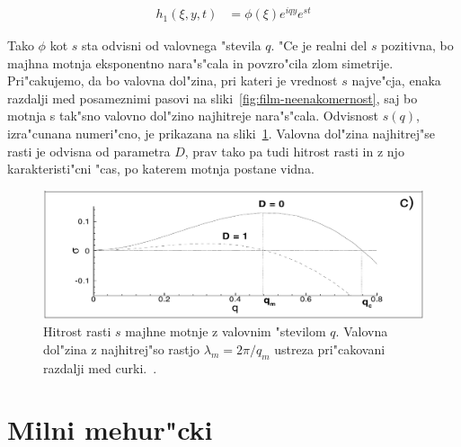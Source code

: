 \documentclass[a4paper,12pt]{article}
\begin{document}
\begin{align}
  h_1(\xi, y, t) &= \phi(\xi) e^{iqy} e^{s t}
\end{align}

Tako $\phi$ kot $s$ sta odvisni od valovnega "stevila $q$. "Ce je realni del $s$ pozitivna, bo majhna motnja eksponentno nara"s"cala in povzro"cila zlom simetrije. Pri"cakujemo, da bo valovna dol"zina, pri kateri je vrednost $s$ najve"cja, enaka razdalji med posameznimi pasovi na sliki~\ref{fig:film-neenakomernost}, saj bo motnja s tak"sno valovno dol"zino najhitreje nara"s"cala. Odvisnost $s(q)$, izra"cunana numeri"cno, je prikazana na sliki~\ref{fig:film-rast}. Valovna dol"zina najhitrej"se rasti je odvisna od parametra $D$, prav tako pa tudi hitrost rasti in z njo karakteristi"cni "cas, po katerem motnja postane vidna. 

\begin{figure}[h]
 \centering
 \includegraphics[width=.8\textwidth]{./Slike/film-stabilnost}
 \caption{Hitrost rasti $s$ majhne motnje z valovnim "stevilom $q$. Valovna dol"zina z najhitrej"so rastjo $\lambda_m = 2\pi/q_m$ ustreza pri"cakovani razdalji med curki.~\cite{kondic}. }
 \label{fig:film-rast}
\end{figure}

\newpage
\section{Milni mehur"cki}
\end{document}
